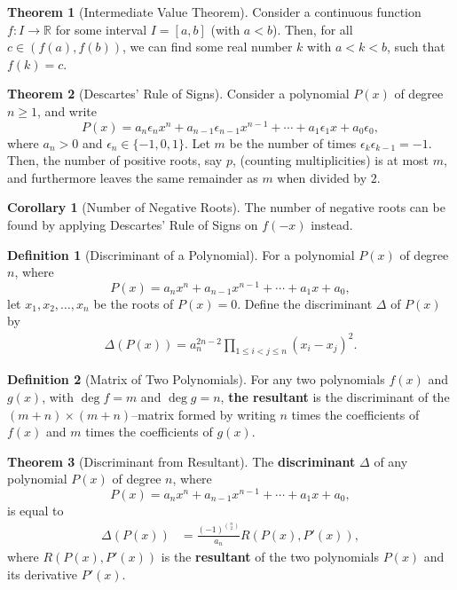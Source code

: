 \documentclass[12pt,a4paper]{memoir}
\theoremstyle{definition}
\newtheorem*{definition}{Definition}
\newtheorem{theorem}{Theorem}
\newtheorem{corollary}{Corollary}
\begin{document}
\begin{theorem}[Intermediate Value Theorem]
	Consider a continuous function $f : I \to\mathbb R$ for some interval $I = [a, b]$ (with $a < b$). Then, for all $c \in (f(a), f(b))$, we can find some real number $k$ with $a < k < b$, such that $f(k) = c$.
\end{theorem}


\begin{theorem}[Descartes' Rule of Signs]
	Consider a polynomial $P(x)$ of degree $n \geq 1$, and write
	\[P(x) = a_n\epsilon_nx^n + a_{n-1}\epsilon_{n-1}x^{n-1} + \cdots + a_1\epsilon_1x + a_0\epsilon_0,\]
	where $a_n > 0$ and $\epsilon_n \in \{-1, 0, 1\}$. Let $m$ be the number of times $\epsilon_k\epsilon_{k-1}=-1$. Then, the number of positive roots, say $p$, (counting multiplicities) is at most $m$, and furthermore leaves the same remainder as $m$ when divided by $2$.
\end{theorem}

\begin{corollary}[Number of Negative Roots]
	The number of negative roots can be found by applying Descartes' Rule of Signs on $f(-x)$ instead.
\end{corollary}

\begin{definition}[Discriminant of a Polynomial]
	For a polynomial $P(x)$ of degree $n$, where
	\[P(x) = a_nx^n + a_{n-1}x^{n-1} + \cdots + a_1x + a_0,\]
	let $x_1,x_2,\ldots,x_n$ be the roots of $P(x)=0$. Define the discriminant $\Delta$ of $P(x)$ by
	\begin{align*}
		\Delta(P(x))=a_n^{2n-2} \prod_{1\leq i<j \leq n } (x_i-x_j)^2.
	\end{align*}
\end{definition}


\begin{definition}[Matrix of Two Polynomials]
	For any two polynomials $f(x)$ and $g(x)$, with $\deg f = m$ and $\deg g = n$, \textbf{the resultant} is the discriminant of the $(m + n) \times (m + n)$--matrix formed by writing $n$ times the coefficients of $f(x)$ and $m$ times the coefficients of $g(x)$.
\end{definition}

\begin{theorem}[Discriminant from Resultant]
	The \textbf{discriminant} $\Delta$ of any polynomial $P(x)$ of degree $n$, where
	\[P(x) = a_nx^n + a_{n-1}x^{n-1} + \cdots + a_1x + a_0,\]
	is equal to
	\begin{align*}
		\Delta(P(x)) &= \frac{(-1)^{\binom{n}{2}}}{a_n}R(P(x), P'(x)),
	\end{align*}
	where $R(P(x),P'(x))$ is the \textbf{resultant} of the two polynomials $P(x)$ and its derivative $P'(x)$.
\end{theorem}
\end{document}
